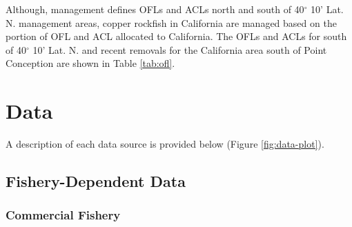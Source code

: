 \documentclass[11pt,
  english,
  a4paper,
]{article}
\begin{document}
\leavevmode\tagmcend\tagstructend\par


Although, management defines OFLs and ACLs north and south of 40{\(^\circ\)\leavevmode\tagmcend\tagstructend} 10' Lat. N. management areas, copper rockfish in California are managed based on the portion of OFL and ACL allocated to California. The OFLs and ACLs for south of 40{\(^\circ\)\leavevmode\tagmcend\tagstructend} 10' Lat. N. and recent removals for the California area south of Point Conception are shown in Table \ref{tab:ofl}.

\leavevmode\tagmcend\tagstructend\par


\hypertarget{data}{%
\section{Data}\label{data}}

\leavevmode\tagmcend\tagstructend


A description of each data source is provided below (Figure \ref{fig:data-plot}).

\leavevmode\tagmcend\tagstructend\par


\hypertarget{fishery-dependent-data}{%
\subsection{Fishery-Dependent Data}\label{fishery-dependent-data}}

\leavevmode\tagmcend\tagstructend


\hypertarget{commercial-fishery}{%
\subsubsection{Commercial Fishery}\label{commercial-fishery}}

\leavevmode\tagmcend\tagstructend

\end{document}
